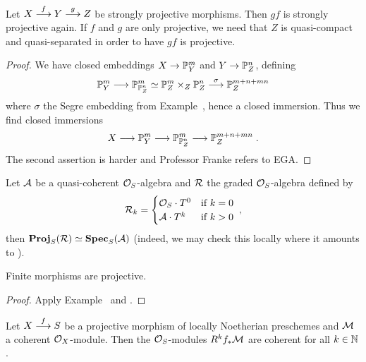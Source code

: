 \documentclass[a4paper,parskip=half,numbers=enddot, DIV=12]{scrreprt}
\begin{document}
\begin{prop}
	Let $X\morphism[f]Y\morphism[g]Z$ be strongly projective morphisms. Then $gf$ is strongly projective again. If $f$ and $g$ are only projective, we need that $Z$ is quasi-compact and quasi-separated in order to have $gf$ is projective.
\end{prop}
\begin{proof}
	We have closed embeddings $X\morphism\IP_Y^m$ and $Y\morphism\IP_Z^n$, defining
	\begin{align*}
		\IP_Y^m\morphism\IP_{\IP_Z^n}^m\simeq \IP_Z^m\times_Z\IP_Z^n\morphism[\sigma]\IP_Z^{m+n+mn}
	\end{align*}
	where $\sigma$ the Segre embedding from Example~, hence a closed immersion. Thus we find closed immersions 
	\begin{align*}
		X\morphism \IP_Y^m\morphism\IP_{\IP_Z^n}^m\morphism\IP_Z^{m+n+mn}\;.
	\end{align*}	
	The second assertion is harder and Professor Franke refers to EGA.
\end{proof}
\begin{example}
	Let $\mathcal{A}$ be a quasi-coherent $\mathcal{O}_S$-algebra and $\mathcal{R}$ the graded $\mathcal{O}_S$-algebra defined by
	\begin{align*}
		\mathcal{R}_k=\begin{cases}
			\mathcal{O}_S\cdot T^0 & \text{if }k=0\\
			\mathcal{A}\cdot T^k & \text{if }k>0
		\end{cases}\;,
	\end{align*}
	then $\operatorname{\mathbf{Proj}}_S(\mathcal{R})\simeq \operatorname{\mathbf{Spec}}_S(\mathcal{A})$ (indeed, we may check this locally where it amounts to \cite[Example~2.5.2]{alggeo1}).
\end{example}
\begin{cor}
	Finite morphisms are projective.
\end{cor}
\begin{proof}
	Apply Example~ and \cite[Lemma~2.5.1]{alggeo1}.
\end{proof}
\begin{thm}
	Let $X\morphism[f]S$ be a projective morphism of locally Noetherian preschemes and $\mathcal{M}$ a coherent $\mathcal{O}_X$-module. Then the $\mathcal{O}_S$-modules $R^kf_*\mathcal{M}$ are coherent for all $k\in\mathbb{N}$.
\end{thm}
\end{document}
